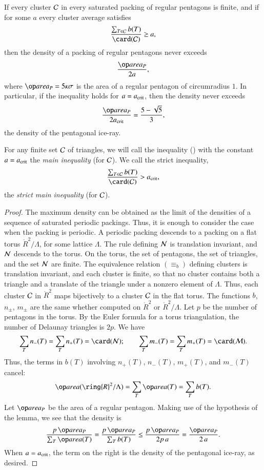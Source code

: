 \begin{lemma}  
If  every cluster $\mathcal C$ in every saturated packing of regular
  pentagons is finite, and if for some $a$ every cluster average
  satisfies
\begin{equation}\libel{eqn:main}
\frac{\sum_{T\in \C} b(T)}{\card(\C)} \ge a,
\end{equation}
then the density of a packing of regular pentagons never exceeds 
\[
\frac{\area_P} {2 a},
\]
where $\area_P = 5\kappa\sigma$ is the area of a regular pentagon of
circumradius $1$.  In particular, if the inequality holds for
$a=a_\text{crit}$, then the density never exceeds
\[
\frac{\area_P}{2 \acrit} = \frac{5 - \sqrt{5}}{3},
\] %
the density of the pentagonal ice-ray.
\end{lemma}

For any finite set $\mathcal C$ of triangles, we will call the inequality
() with the constant $a=a_\text{crit}$ the {\it main inequality}
(for $\mathcal C$).  We call the strict inequality,
\begin{equation}\libel{eqn:strict-main}
\frac{\sum_{T\in \C} b(T)}{\card(\C)} > \acrit,
\end{equation}
the {\it strict main inequality} (for $\mathcal C$).


\begin{proof} The maximum density can be obtained as the limit of the
  densities of a sequence of saturated periodic packings.  Thus, it is
  enough to consider the case when the packing is periodic.  A
  periodic packing descends to a packing on a flat torus
  $\ring{R}^2/\Lambda$, for some lattice $\Lambda$.  The rule defining
  $\mathcal N$ is translation invariant, and $\mathcal N$ descends to the torus.  On
  the torus, the set of pentagons, the set of triangles, and the set
  $\mathcal N$ are finite.  The equivalence relation $(\equiv_b)$ defining
  clusters is translation invariant, and each cluster is finite, so
  that no cluster contains both a triangle and a translate of the
  triangle under a nonzero element of $\Lambda$.  Thus, each cluster
  $\mathcal C$ in $\ring{R}^2$ maps bijectively to a cluster $\mathcal C$ in the flat
  torus.  The functions $b$, $n_\pm$, $m_\pm$ are the same whether
  computed on $\ring{R}^2$ or $\ring{R}^2/\Lambda$.  Let $p$ be the
  number of pentagons in the torus.  By the Euler formula for a torus
  triangulation, the number of Delaunay triangles is $2p$.  We have
\[
\sum_{T} n_-(T) =  \sum_{T} n_+(T) = \card(\N);\qquad
\sum_{T} m_-(T) =  \sum_{T} m_+(T) = \card(\M).
\]
Thus, the terms in $b(T)$ involving $n_+(T)$, $n_-(T)$, $m_+(T)$,
and $m_-(T)$ cancel:
\[
\area(\ring{R}^2/\Lambda) = \sum_T \area(T) = \sum_T b(T).
\]    
Let $\area_P$ be the area of a regular pentagon.  Making use of the
hypothesis of the lemma, we see that the density is
\[
\frac{p\, \area_P}{\sum_T \area(T)} 
=\frac{p\, \area_P}{\sum_T b(T)} \le\frac{p\, \area_P}{2 p\, a} 
= \frac{\area_P}{2\, a}.
\]
When $a=a_\text{crit}$, the term on the right is the density of the
pentagonal ice-ray, as desired.
\end{proof}

